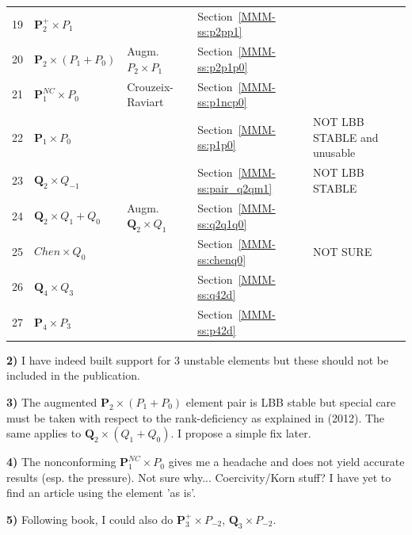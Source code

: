 \begin{center}
\begin{tabular}{p{1cm}p{2cm}p{3.5cm}p{2.25cm}p{5cm}}
19&${\bm P}_2^+\times P_{1}$   &                             & Section~\ref{MMM-ss:p2pp1}\\
20&${\bm P}_2\times (P_1+P_0)$ & Augm. $P_2\times P_1$       & Section~\ref{MMM-ss:p2p1p0}\\
21&${\bm P}_1^{NC}\times P_0$  & Crouzeix-Raviart            & Section~\ref{MMM-ss:p1ncp0}\\
22&${\bm P}_1\times P_0$       &                             & Section~\ref{MMM-ss:p1p0}  &NOT LBB STABLE and unusable\\
23&${\bm Q}_2\times Q_{-1}$    &                             & Section~\ref{MMM-ss:pair_q2qm1} & NOT LBB STABLE\\
24&${\bm Q}_2\times Q_1+Q_0$   & Augm. ${\bm Q}_2\times Q_1$ & Section~\ref{MMM-ss:q2q1q0} \\
25&$Chen\times Q_0$            &                             & Section~\ref{MMM-ss:chenq0} & NOT SURE \\
26&${\bm Q}_4\times Q_3$       &                             & Section~\ref{MMM-ss:q42d}\\
27&${\bm P}_4\times P_3$       &                             & Section~\ref{MMM-ss:p42d}\\
\hline
\end{tabular}
\end{center}

\begin{remark}
{\bf 2)} I have indeed built support for 3 unstable elements but 
these should not be included in the publication. 
\end{remark}

\begin{remark}
{\bf 3)} The augmented ${\bm P}_2\times (P_1+P_0)$ element pair is LBB stable 
but special care must be taken with respect to the rank-deficiency 
as explained in \textcite{bocg12} (2012). The same applies to ${\bm Q}_2\times (Q_1+Q_0)$. 
I propose a simple fix later. 
\end{remark}

\begin{remark}
{\bf 4)} The nonconforming ${\bm P}_1^{NC}\times P_0$ gives me a headache and does not 
yield accurate results (esp. the pressure). Not sure why... Coercivity/Korn stuff? I
have yet to find an article using the element 'as is'.
\end{remark}

\begin{remark}
{\bf 5)} Following \textcite{john16} book, I could also do 
${\bm P}_3^+\times P_{-2}$, ${\bm Q}_3\times P_{-2}$. 
\end{remark}

